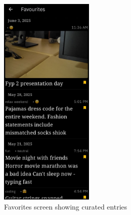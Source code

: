 \begin{figure}[H]
\centering
\includegraphics[width=0.4\textwidth]{files/imgs/prototype/favorites_screen.jpeg}
\caption{Favorites screen showing curated entries}
\label{fig:favorites-screen}
\end{figure}